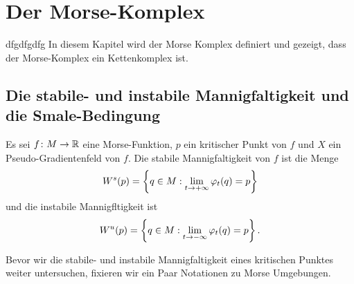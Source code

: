 \chapter{Der Morse-Komplex}
dfgdfgdfg
In diesem Kapitel wird der Morse Komplex definiert und gezeigt, dass der 
Morse-Komplex ein Kettenkomplex ist.

\section{Die stabile- und instabile Mannigfaltigkeit und die Smale-Bedingung}

\begin{definition}
    \label{def: stabile und instabile mannigfaltigkeit}
    Es sei $f \colon M \to { \mathbb R }$ eine Morse-Funktion, $p$ ein kritischer Punkt von $f$ und $X$ ein
    Pseudo-Gradientenfeld von $f$. Die stabile Mannigfaltigkeit von $f$ ist die Menge
    \[ { W^s } (p) = \left\{ q \in M : \lim_{t \to + \infty} \varphi_t(q) = p \right\} \]
    und die instabile Mannigfltigkeit ist
    \[ { W^u } (p) = \left\{ q \in M : \lim_{t \to - \infty} \varphi_t(q) = p \right\} . \]
\end{definition}

Bevor wir die stabile- und instabile Mannigfaltigkeit eines kritischen Punktes weiter untersuchen, 
fixieren wir ein Paar Notationen zu Morse Umgebungen.

